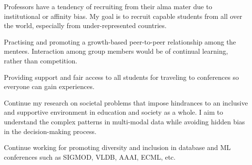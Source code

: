 %
\begin{enumerate*}[leftmargin=*, noitemsep, topsep=0pt, label=(\arabic*)]
    \item Professors have a tendency of recruiting from their alma mater due to institutional or affinity bias. My goal is to recruit capable students from all over the world, especially from under-represented countries.
    \item Practising and promoting a growth-based peer-to-peer relationship among the mentees. Interaction among group members would be of continual learning, rather than competition.
    \item Providing support and fair access to all students for traveling to conferences so everyone can gain experiences.
    \item Continue my research on societal problems that impose hindrances to an inclusive and supportive environment in education and society as a whole. I aim to understand the complex patterns in multi-modal data while avoiding hidden bias in the decision-making process. 
    \item Continue working for promoting diversity and inclusion in database and ML conferences such as SIGMOD, VLDB, AAAI, ECML, etc.
\end{enumerate*}